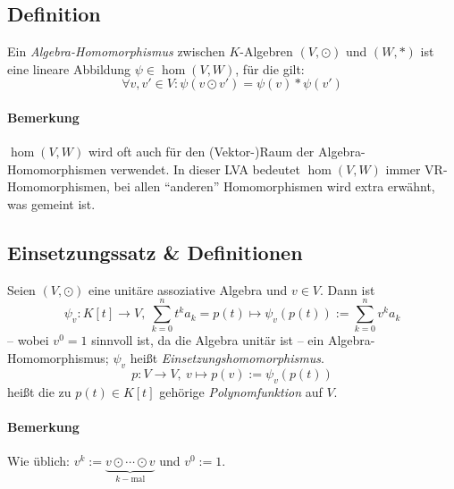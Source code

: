 \subsection{Definition}
	\begin{Definition}
		Ein \emph{Algebra-Homomorphismus} zwischen $ K $-Algebren $ (V,\odot) $ und $ (W,*) $ ist eine lineare Abbildung $ \psi\in \hom(V,W) $, für die gilt:
		\[ \forall v,v' \in V: \psi(v\odot v')=\psi(v)*\psi(v') \]
	\end{Definition}
\paragraph{Bemerkung}
	$ \hom(V,W) $ wird oft auch für den (Vektor-)Raum der Algebra-Homomorphismen verwendet. In dieser LVA bedeutet $ \hom(V,W) $ immer VR-Homomorphismen, bei allen "`anderen"' Homomorphismen wird extra erwähnt, was gemeint ist.


\subsection{Einsetzungssatz \& Definitionen}
	\begin{Satz}[Einsetzungssatz]
		Seien $ (V,\odot) $ eine unitäre assoziative Algebra und $ v\in V $. Dann ist
			\[ \psi_v: K[t]\to V,\ \sum_{k=0}^{n}t^ka_k = p(t)\mapsto \psi_v(p(t)) := \sum_{k=0}^{n}v^ka_k \]
		-- wobei $ v^0 = 1 $ sinnvoll ist, da die Algebra unitär ist -- ein Algebra-Homomorphismus; $ \psi_v $ heißt \emph{Einsetzungshomomorphismus}. 
			\[ p:V\to V,\ v\mapsto p(v) := \psi_v(p(t)) \]
		heißt die zu $ p(t)\in K[t] $ gehörige \emph{Polynomfunktion} auf $ V $.
	\end{Satz}
\paragraph{Bemerkung}
	Wie üblich: $ v^k := \underset{k-\text{mal}}{\underbrace{v\odot\cdots \odot v}} $ und $ v^0 := 1 $.
